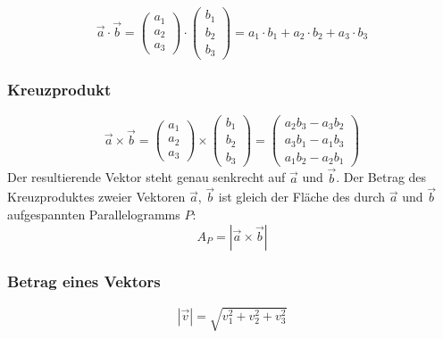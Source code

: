 \begin{equation}
	\overrightarrow{a} \cdot \overrightarrow{b}
	= \left( \begin{array}{c} a_1\\a_2\\a_3\end{array}\right) \cdot \left( \begin{array}{c} b_1\\b_2\\b_3\end{array}\right)
	= a_1 \cdot b_1 + a_2 \cdot b_2 + a_3 \cdot b_3
\end{equation}

\subsubsection{Kreuzprodukt}
\label{ssub:kreuzprodukt}

\begin{equation}
	\overrightarrow{a} \times \overrightarrow{b} = \begin{pmatrix}a_1\\a_2\\a_3\end{pmatrix}
	\times \begin{pmatrix}b_1\\b_2\\b_3\end{pmatrix}
	= \begin{pmatrix}a_2b_3 - a_3b_2 \\ a_3b_1 - a_1b_3 \\ a_1b_2 - a_2b_1\end{pmatrix}
\end{equation}
Der resultierende Vektor steht genau senkrecht auf $\overrightarrow{a}$ und $\overrightarrow{b}$.
Der Betrag des Kreuzproduktes zweier Vektoren $\overrightarrow{a}$, $\overrightarrow{b}$ 
ist gleich der Fläche des durch $\overrightarrow{a}$ und $\overrightarrow{b}$
aufgespannten Parallelogramms $P$:
\begin{equation}
 	A_P = |\overrightarrow{a} \times \overrightarrow{b}|
\end{equation}

\subsubsection{Betrag eines Vektors}
\label{ssub:betrag_eines_vektors}

\begin{equation}
	|\overrightarrow{v}| = \sqrt{v_1^2 + v_2^2 + v_3^2}
\end{equation}

